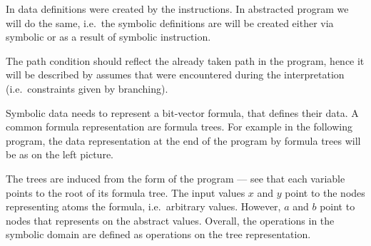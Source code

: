 In \SymDIVINE data definitions were created by the instructions. In abstracted
program we will do the same, i.e.~the symbolic definitions are will be created either via symbolic
 or as a result of symbolic instruction.

The path condition should reflect the already taken path in the program, hence
it will be described by assumes that were encountered during the interpretation
(i.e.~constraints given by branching).

Symbolic data needs to represent a bit-vector formula, that defines their data.
A common formula representation are formula trees. For example in the following
program, the data representation at the end of the program by formula trees will
be as on the left picture.

\bigskip
\noindent
{}
\hfill
{}

The trees are induced from the \SSA form of the program --- see that each
variable points to the root of its formula tree. The input values $x$ and $y$
point to the nodes representing atoms the formula, i.e.~arbitrary values.
However, $a$ and $b$ point to nodes that represents on the abstract values.
Overall, the operations in the symbolic domain are defined as operations on
the tree representation.

